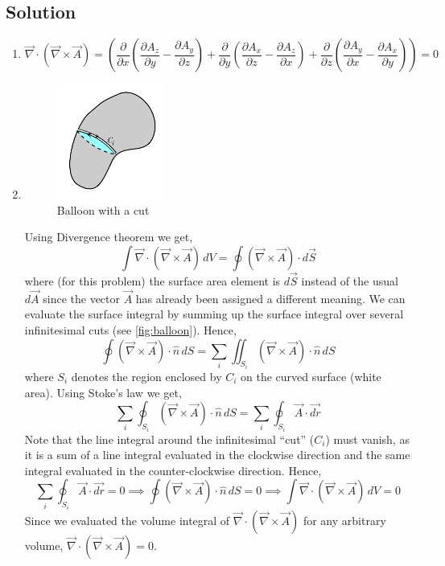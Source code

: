 \documentclass[solutions]{esg8022pset}
\newcommand{\KKdiv}[6]{{#4}\left(\frac{\partial}{\partial x}{#1} {#5} \frac{\partial}{\partial y}{#2} {#6}\frac{\partial}{\partial z}{#3} \right)}
\begin{document}
\subsection{Solution}
  \begin{enumerate}
    \item $$\vec{\nabla}\cdot \left( \vec{\nabla} \times \vec{A} \right) = \KKdiv{\left( \frac{\partial A_z}{\partial y} - \frac{\partial A_y}{\partial z} \right)} {\left( \frac{\partial A_x}{\partial z} - \frac{\partial A_z}{\partial x} \right)} {\left( \frac{\partial A_y}{\partial x} - \frac{\partial A_x}{\partial y} \right)}{}{+}{+} = 0 $$
    \item
      \begin{figure}[ht]
        \centering
        \includegraphics[width=0.33\textwidth]{ps03_sol_02}
        \caption{Balloon with a cut}
        \label{fig:balloon}
      \end{figure}
      Using Divergence theorem we get,
      $$\int \vec{\nabla}\cdot \left( \vec{\nabla} \times \vec{A} \right)\,dV = \oint \left( \vec{\nabla} \times \vec{A} \right)\cdot d\vec{S}$$
      where (for this problem) the surface area element is $d\vec{S}$ instead of the usual $d\vec{A}$ since the vector $\vec{A}$ has already been assigned a different meaning. We can evaluate the surface integral by summing up the surface integral over several infinitesimal cuts (see \autoref{fig:balloon}).
      Hence,
      $$\oint  \left( \vec{\nabla} \times \vec{A} \right)\cdot \hat{n}\,dS = \sum_i \iint_{S_i}\left( \vec{\nabla} \times \vec{A} \right)\cdot \hat{n}\,dS$$
      where $S_i$ denotes the region enclosed by $C_i$ on the curved surface (white area). Using Stoke's law we get,
      $$\sum_i \oint_{S_i}\left( \vec{\nabla} \times \vec{A} \right)\cdot \hat{n}\,dS = \sum_i \oint_{S_i} \vec{A}\cdot \vec{dr}$$
      Note that the line integral around the infinitesimal ``cut'' ($C_i$) must vanish, as it is a sum of a line integral evaluated in the clockwise direction and the same integral evaluated in the counter-clockwise direction. Hence,
      $$\sum_i \oint_{S_i} \vec{A}\cdot \vec{dr} = 0 \implies  \oint  \left( \vec{\nabla} \times \vec{A} \right)\cdot \hat{n}\,dS = 0 \implies \int \vec{\nabla}\cdot \left( \vec{\nabla} \times \vec{A} \right)\,dV = 0$$
      Since we evaluated the volume integral of $\vec{\nabla}\cdot \left( \vec{\nabla} \times \vec{A} \right)$ for any arbitrary volume, $\vec{\nabla}\cdot \left( \vec{\nabla} \times \vec{A}\right) = 0$.
  \end{enumerate}
\end{document}

